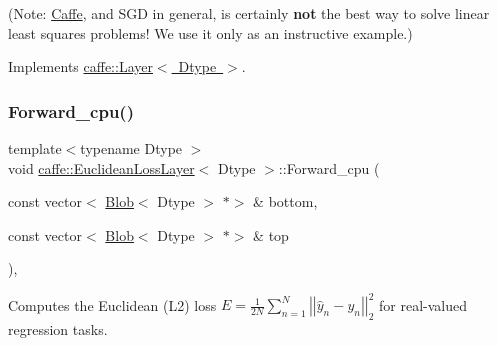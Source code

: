 (Note\+: \mbox{\hyperlink{classcaffe_1_1_caffe}{Caffe}}, and S\+GD in general, is certainly {\bfseries not} the best way to solve linear least squares problems! We use it only as an instructive example.) 

Implements \mbox{\hyperlink{classcaffe_1_1_layer_a576ac6a60b1e99fe383831f52a6cea77}{caffe\+::\+Layer$<$ Dtype $>$}}.

\mbox{\label{classcaffe_1_1_euclidean_loss_layer_a3bc5a947caadac1a352a89b08720c7e7}} 
\subsubsection{\texorpdfstring{Forward\+\_\+cpu()}{Forward\_cpu()}\hspace{0.1cm}{\footnotesize\ttfamily [2/2]}}
{\footnotesize\ttfamily template$<$typename Dtype $>$ \\
void \mbox{\hyperlink{classcaffe_1_1_euclidean_loss_layer}{caffe\+::\+Euclidean\+Loss\+Layer}}$<$ Dtype $>$\+::Forward\+\_\+cpu (\begin{DoxyParamCaption}\item[{const vector$<$ \mbox{\hyperlink{classcaffe_1_1_blob}{Blob}}$<$ Dtype $>$ $\ast$$>$ \&}]{bottom,  }\item[{const vector$<$ \mbox{\hyperlink{classcaffe_1_1_blob}{Blob}}$<$ Dtype $>$ $\ast$$>$ \&}]{top }\end{DoxyParamCaption})\hspace{0.3cm}{\ttfamily [protected]}, {\ttfamily [virtual]}}



Computes the Euclidean (L2) loss $ E = \frac{1}{2N} \sum\limits_{n=1}^N \left| \left| \hat{y}_n - y_n \right| \right|_2^2 $ for real-\/valued regression tasks. 


